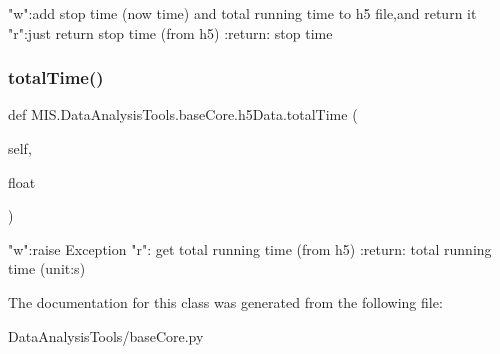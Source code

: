 \begin{DoxyVerb}"w":add stop time (now time) and total running time to h5 file,and return it
"r":just return stop time (from h5)
:return: stop time
\end{DoxyVerb}
 \mbox{\label{classMIS_1_1DataAnalysisTools_1_1baseCore_1_1h5Data_af90eab1413100574362325cf8deb68f7}} 
\subsubsection{\texorpdfstring{total\+Time()}{totalTime()}}
{\footnotesize\ttfamily def M\+I\+S.\+Data\+Analysis\+Tools.\+base\+Core.\+h5\+Data.\+total\+Time (\begin{DoxyParamCaption}\item[{}]{self,  }\item[{}]{float }\end{DoxyParamCaption})}

\begin{DoxyVerb}"w":raise Exception
"r": get total running time (from h5)
:return: total running time (unit:s)
\end{DoxyVerb}
 

The documentation for this class was generated from the following file\+:\begin{DoxyCompactItemize}
\item 
Data\+Analysis\+Tools/base\+Core.\+py\end{DoxyCompactItemize}
